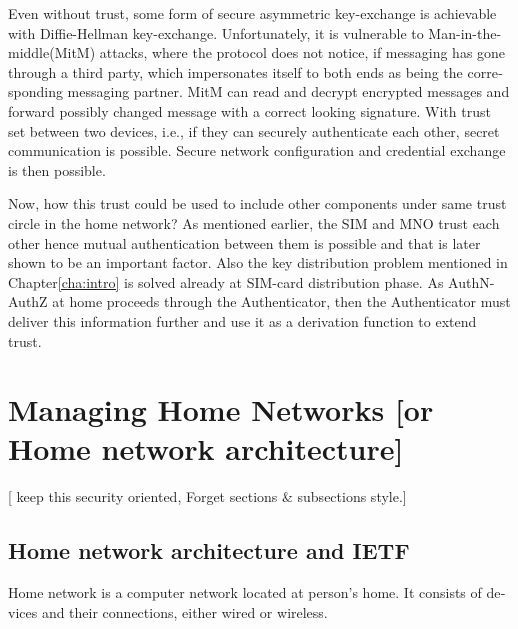 \documentclass[12pt,a4paper,english]{tutthesis}
\begin{document}
\begin{otherlanguage}{english}
Even without trust, some form of secure asymmetric key-exchange is achievable
with Diffie-Hellman key-exchange\cite{diffie1976new}. Unfortunately, it is vulnerable
to Man-in-the-middle(MitM) attacks, where the protocol does not notice, 
if messaging has gone through a third party, which impersonates itself to 
both ends as being the corresponding messaging partner. MitM can
read and decrypt encrypted messages and forward possibly changed message with
a correct looking signature.
With trust set between two devices, i.e.,  if they can securely
authenticate each other, secret communication is possible. 
Secure network configuration and credential exchange is then possible.



Now, how this trust could be used to include other components under
same trust circle in the home network? As mentioned earlier, the SIM
and MNO trust each other hence mutual authentication between them is
possible and that is later shown to be an important factor.  Also the
key distribution problem mentioned in Chapter\ref{cha:intro} is solved
already at SIM-card distribution phase.  As AuthN-AuthZ at home
proceeds through the Authenticator, then the Authenticator must
deliver this information further and use it as a derivation function
to extend trust.




\chapter{Managing Home Networks [or Home network architecture]}
\label{sec-3}
[ keep this security oriented, Forget sections \& subsections style.]

\section{Home network architecture and IETF}
\label{sec-3-1}


Home network is a computer network located at person's home. It consists
of devices and their connections, either wired or wireless.


\end{otherlanguage}
\end{document}
